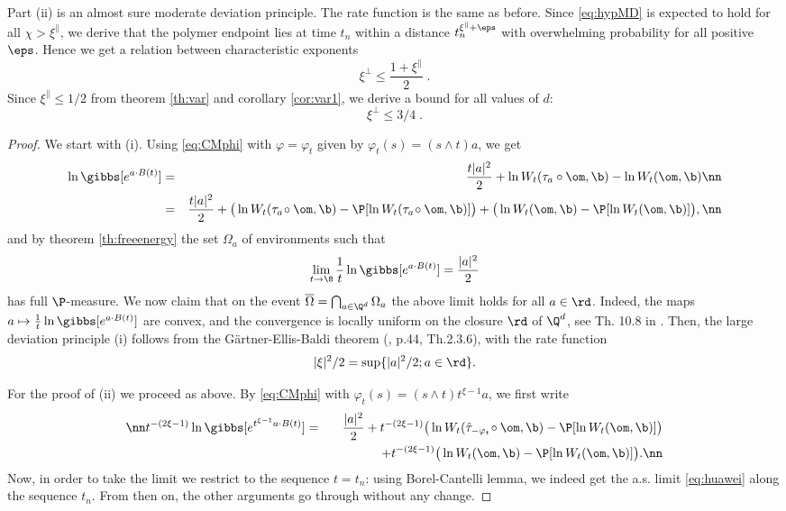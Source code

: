  Part (ii) is an almost sure moderate deviation principle. The rate function is the same as before. Since \eqref{eq:hypMD} is expected to hold for all $\chi > \xi^\parallel$, we derive that the polymer endpoint lies 
 at time $t_n$ within a distance $t_n^{ \xi^\parallel + \eps}$  with overwhelming probability for all positive $\eps$. Hence we get a relation between characteristic exponents
 \begin{equation} \label{eq:exprelation}
 \xi^\perp  \leq \frac{1+  \xi^\parallel}{2} \;.
\end{equation}
Since $ \xi^\parallel \leq 1/2$ from theorem \ref{th:var} and corollary \ref{cor:var1}, we derive a bound for all values of $d$:
 \begin{equation} \label{eq:exprelation3/4}
 \xi^\perp  \leq 3/4  \;.
\end{equation}
 \begin{proof} We start with (i). 
 Using \eqref{eq:CMphi} with $\varphi=\varphi_t$ given by $\varphi_t(s)= (s \wedge t )a$, we get
\begin{eqnarray}
\ln \gibbs[ e^{a \cdot B(t)}] &=& \frac{t |a|^2}{2} + \ln W_t(\tau_a \circ \om, \b) -  \ln W_t( \om, \b) \nn \\
 &=& \frac{t |a|^2}{2} + \big(\ln W_t(\tau_a \!\circ \om, \b) - \P[\ln W_t(\tau_a\! \circ \om, \b)]\big)+ \big( \ln W_t( \om, \b) - \P[\ln W_t(\om, \b)]\big),\nn 
 \end{eqnarray}
and by theorem \ref{th:freeenergy} the set $\Omega_a$ of environments such that 
\begin{equation}\label{eq:huawei}
\lim_{t\to \8}  \frac{1}{t}\ln \gibbs[ e^{a \cdot B(t)}] = \frac{ |a|^2}{2} 
\end{equation}
has full $\P$-measure. We now claim that on the event $\overline \Omega= \bigcap_{a \in \Q^d} \Omega_a$ the above limit holds for all $a \in \rd$.  
Indeed, the maps $a \mapsto \frac{1}{t}\ln \gibbs [ e^{a \cdot B(t)}] $ are convex, and the convergence is locally uniform on the closure $\rd$ of $\Q^d$, see Th. 10.8 in \cite{Roc70}.
Then, the large deviation principle  (i) follows from the G\"artner-Ellis-Baldi theorem (\cite{DeZe98}, p.44, Th.2.3.6), with the rate function 
$$|\xi|^2/2 = \sup \{ |a|^2/2; a \in \rd\}.$$

For the proof of (ii) we proceed as above. By \eqref{eq:CMphi} with $\varphi_t(s)= (s \wedge t )t^{\xi-1}a$, we first write
\begin{eqnarray}\nn
t^{-(2\xi-1)}\ln \gibbs[ e^{t^{\xi-1}a \cdot B(t)}] &=& \frac{|a|^2}{2} + t^{-(2\xi-1)} \big(\ln W_t(\hat \tau_{-\varphi_t} \!\circ \om, \b) - \P[\ln W_t(\om, \b)]\big)\\
&& \qquad \qquad +  t^{-(2\xi-1)} \big( \ln W_t( \om, \b) - \P[\ln W_t(\om, \b)]\big).\nn 
 \end{eqnarray}
 Now, in order to take the limit we restrict to the sequence $t=t_n$: using Borel-Cantelli lemma, we indeed get the a.s. limit \eqref{eq:huawei} along the sequence $t_n$. 
 From then on, the other arguments go through without any change.
 \end{proof}
 

